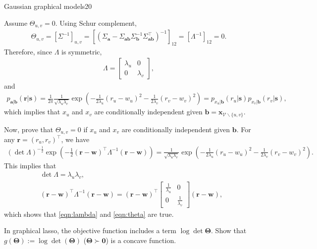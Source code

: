 \documentclass{article}
\begin{document}
\begin{problem}{Gaussian graphical models}{20}
{	
Assume $\Theta_{u,v}=0$.
Using Schur complement, 
	\begin{align}
	\Theta_{u,v}=\left[\Sigma^{-1}\right]_{u,v}=\left[\left(\Sigma_{\bm{a}}-\Sigma_{\bm{a}\bm{b}}\Sigma_{\bm{b}}^{-1}\Sigma_{\bm{a}\bm{b}}^\top\right)^{-1}\right]_{12}=\left[\Lambda^{-1}\right]_{12}=0.\label{eqn:theta}
	\end{align}
Therefore, since $\Lambda$ is symmetric,
	\begin{align}
	\Lambda=\left[\begin{array}{ll} \lambda_u & 0\\0&\lambda_v	\end{array}\right],\label{eqn:lambda}
	\end{align}
and
	\begin{align*}
	p_{\bm{a}|\bm{b}}(\bm{r}|\bm{s})=\frac{1}{2\pi}\frac{1}{\sqrt{\lambda_u\lambda_v}}\exp\left(-\frac{1}{2\lambda_u} (r_u-w_u)^2-\frac{1}{2\lambda_v} (r_v-w_v)^2\right)=p_{x_u|\bm{b}}(r_u|\bm{s})	p_{x_v|\bm{b}}(r_v|\bm{s}),
	\end{align*}
which implies that $x_u$ and $x_v$ are conditionally independent given $\bm{b}=\bm{x}_{\mathcal{V}\backslash\{u,v\}}$.

Now, prove that $\Theta_{u,v}=0$ if $x_u$ and $x_v$ are conditionally independent given $\bm{b}$.
For any $\bm{r}=(r_u,r_v)^\top$, we have
	\begin{align*}
	 (\det \Lambda )^{-\frac{1}{2}} \exp\left(-\frac{1}{2}(\bm{r}-\bm{w})^\top \Lambda^{-1}(\bm{r}-\bm{w})\right)=\frac{1}{\sqrt{\lambda_u\lambda_v}}\exp\left(-\frac{1}{2\lambda_u} (r_u-w_u)^2-\frac{1}{2\lambda_v} (r_v-w_v)^2\right).
	\end{align*}
This implies that
	\begin{align*}
	&\det\Lambda=\lambda_u\lambda_v,\\
	&(\bm{r}-\bm{w})^\top \Lambda^{-1}(\bm{r}-\bm{w})=(\bm{r}-\bm{w})^\top \left[\begin{array}{ll} \frac{1}{\lambda_u}& 0\\ 0& \frac{1}{\lambda_v} \end{array}\right](\bm{r}-\bm{w}),
	\end{align*}
which shows that \eqref{eqn:lambda} and \eqref{eqn:theta} are true.

}

In graphical lasso, the objective function includes a term $\log \det \bm{\Theta}$. Show that $g(\bm{\Theta}):=\log \det (\bm{\Theta})$ ($\bm{\Theta}\succ \bm{0}$) is a concave function.
 

\end{problem}
\end{document}

